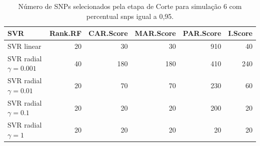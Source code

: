 \begin{table}[ht]
\centering
\begin{tabular}{lrrrrr}
  \hline
SVR & Rank.RF & CAR.Score & MAR.Score & PAR.Score & I.Score \\ 
  \hline
SVR linear & 20 & 30 & 30 & 910 & 40 \\ 
  SVR radial $\gamma = 0.001$ & 40 & 180 & 180 & 410 & 240 \\ 
  SVR radial $\gamma = 0.01$ & 20 & 70 & 70 & 230 & 60 \\ 
  SVR radial $\gamma = 0.1$ & 20 & 20 & 20 & 200 & 20 \\ 
  SVR radial $\gamma = 1$ & 20 & 20 & 20 & 20 & 20 \\ 
   \hline
\end{tabular}
\caption{Número de SNPs selecionados pela etapa de Corte para simulação 6 com percentual snps igual a 0,95.} 
\end{table}
